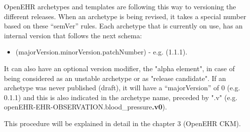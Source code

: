 \documentclass[mim_thesis.tex]{subfiles}
\begin{document}
OpenEHR archetypes and templates are following this way to versioning the different releases. When an archetype is being revised, it takes a special number based on these “semVer” rules. Each archetype that is currently on use, has an internal version that follows the next schema:
\begin{itemize} [noitemsep]
\item (majorVersion.minorVersion.patchNumber) - e.g. (1.1.1).
\end{itemize}

It can also have an optional version modifier, the "alpha element", in case of being considered as an unstable archetype or as "release candidate". If an archetype was never published (draft), it will have a “majorVersion” of 0 (e.g. 0.1.1) and this is also indicated in the archetype name, preceded by ".v" (e.g. openEHR-EHR-OBSERVATION.blood\_pressure\textbf{.v0}). \citep{openEHRCKM}

This procedure will be explained in detail in the chapter 3 (OpenEHR CKM).  


\newpage
\end{document}
